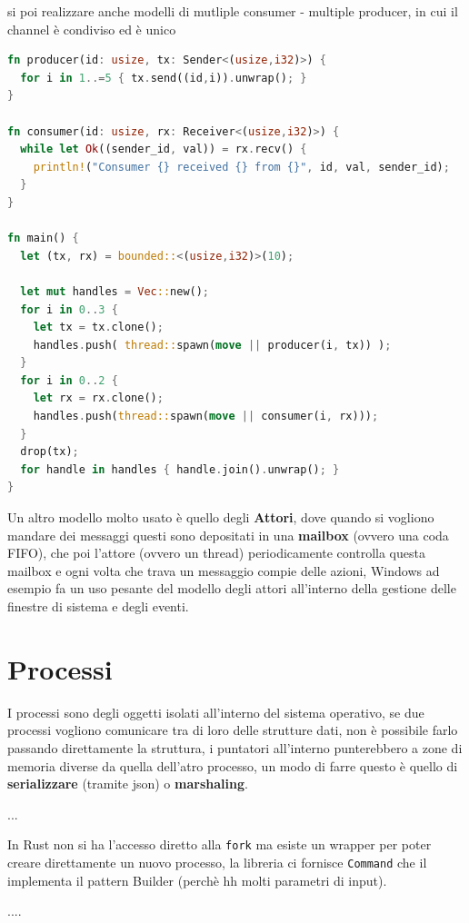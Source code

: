 \documentclass[12pt]{article}
\begin{document}
si poi realizzare anche modelli di mutliple consumer - multiple producer, in cui il channel \`e condiviso ed \`e unico
\begin{lstlisting}[language=rust]
fn producer(id: usize, tx: Sender<(usize,i32)>) {
  for i in 1..=5 { tx.send((id,i)).unwrap(); }
}

fn consumer(id: usize, rx: Receiver<(usize,i32)>) {
  while let Ok((sender_id, val)) = rx.recv() {
    println!("Consumer {} received {} from {}", id, val, sender_id);
  }
}

fn main() {
  let (tx, rx) = bounded::<(usize,i32)>(10);

  let mut handles = Vec::new();
  for i in 0..3 {
    let tx = tx.clone();
    handles.push( thread::spawn(move || producer(i, tx)) );
  }
  for i in 0..2 {
    let rx = rx.clone();
    handles.push(thread::spawn(move || consumer(i, rx)));
  }
  drop(tx);
  for handle in handles { handle.join().unwrap(); }
}
\end{lstlisting}
Un altro modello molto usato \`e quello degli \textbf{Attori}, dove quando si vogliono mandare dei messaggi questi sono depositati in una \textbf{mailbox} (ovvero una coda FIFO), che poi l'attore (ovvero un thread) periodicamente controlla questa mailbox e ogni volta che trava un messaggio compie delle azioni, Windows ad esempio fa un uso pesante del modello degli attori all'interno della gestione delle finestre di sistema e degli eventi.


\section{Processi}
I processi sono degli oggetti isolati all'interno del sistema operativo, se due processi vogliono comunicare tra di loro delle strutture dati, non \`e possibile farlo passando direttamente la struttura, i puntatori all'interno punterebbero a zone di memoria diverse da quella dell'atro processo, un  modo di farre questo \`e quello di \textbf{serializzare} (tramite json) o \textbf{marshaling}.

...

In Rust non si ha l'accesso diretto alla \texttt{fork} ma esiste un wrapper per poter creare direttamente un nuovo processo, la libreria ci fornisce \texttt{Command} che il implementa il pattern Builder (perch\`e hh molti parametri di input).

....
\end{document}
